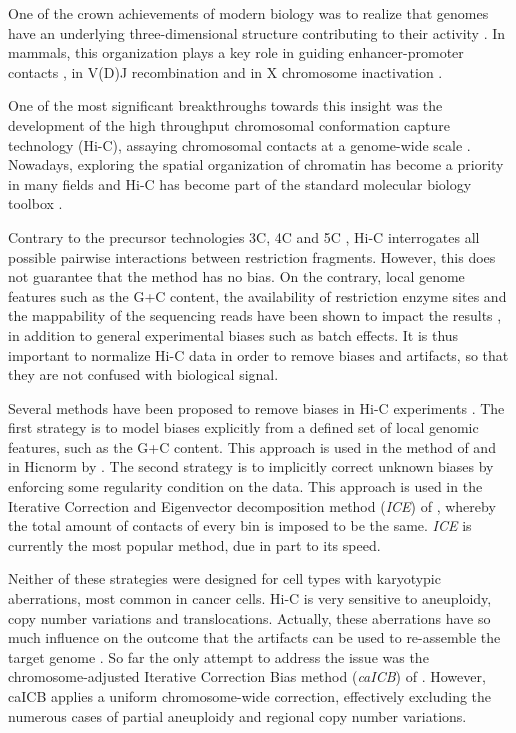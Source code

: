 \documentclass{bioinfo}
\begin{document}
One of the crown achievements of modern biology was to realize that
genomes have an underlying three-dimensional structure contributing to
their activity \citep{rowley2016three}. In mammals, this organization
plays a key role in guiding enhancer-promoter contacts
\citep{de2013topology}, in V(D)J recombination \citep{choi2014ctcf} and in
X chromosome inactivation \citep{galupa2015x}.

One of the most significant breakthroughs towards this insight was the
development of the high throughput chromosomal conformation capture
technology (Hi-C), assaying chromosomal contacts at a genome-wide scale
\citep{lieberman2009comprehensive}. Nowadays, exploring the spatial
organization of chromatin has become a priority in many fields and Hi-C
has become part of the standard molecular biology toolbox
\citep{dekker2013exploring}.

Contrary to the precursor technologies 3C, 4C and 5C \citep{dekker2002capturing,simonis2006nuclear,dostie2006chromosome,de2012decade},
Hi-C interrogates all possible pairwise interactions between restriction
fragments. However, this does not guarantee that the method has no bias.
On the contrary, local genome features such as the G+C content, the
availability of restriction enzyme sites and the mappability of the
sequencing reads have been shown to impact the results
\citep{yaffe2011probabilistic}, in addition to general experimental biases
such as batch effects. It is thus important to normalize Hi-C data in
order to remove biases and artifacts, so that they are not confused with
biological signal.

Several methods have been proposed to remove biases in Hi-C experiments
\citep{schmitt2016genome}. The first strategy is to model biases
explicitly from a defined set of local genomic features, such as the G+C
content. This approach is used in the method of
\cite{yaffe2011probabilistic} and in Hicnorm by \cite{hu2012hicnorm}. The
second strategy is to implicitly correct unknown biases by enforcing some
regularity condition on the data. This approach is used in the
Iterative Correction and Eigenvector decomposition method (\textit{ICE})
of \cite{imakaev2012iterative}, whereby the total amount of contacts of
every bin is imposed to be the same. \textit{ICE} is currently the most
popular method, due in part to its speed.

Neither of these strategies were designed for cell types with
karyotypic aberrations, most common in cancer cells. Hi-C is very
sensitive to aneuploidy, copy number variations and translocations.
Actually, these aberrations have so much influence on the outcome that the
artifacts can be used to re-assemble the target genome
\citep{korbel2013genome}. So far the only attempt to address the issue
was the chromosome-adjusted Iterative Correction Bias method
(\textit{caICB}) of \cite{wu2016computational}.  However, caICB applies a
uniform chromosome-wide correction, effectively excluding the numerous
cases of partial aneuploidy and regional copy number variations.
\end{document}
